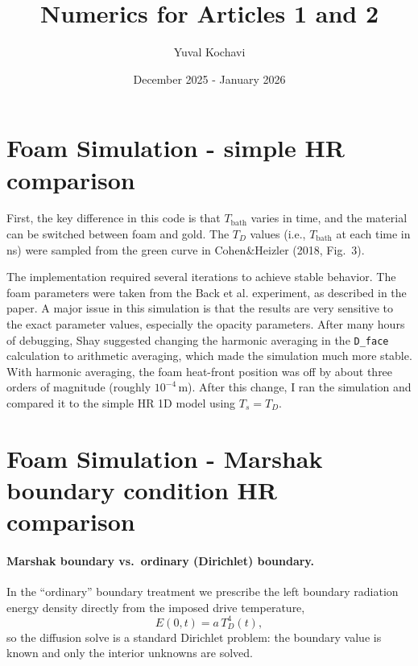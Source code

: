 \documentclass{article}
\title{Numerics for Articles 1 and 2}
\author{Yuval Kochavi}
\date{December 2025 - January 2026}
\begin{document}
\maketitle

\section{Foam Simulation - simple HR comparison}
First, the key difference in this code is that $T_{\text{bath}}$ varies in time, and the material can be switched between foam and gold. The $T_D$ values (i.e., $T_{\text{bath}}$ at each time in ns) were sampled from the green curve in Cohen\&Heizler (2018, Fig.~3).

The implementation required several iterations to achieve stable behavior. The foam parameters were taken from the Back et al. experiment, as described in the paper. A major issue in this simulation is that the results are very sensitive to the exact parameter values, especially the opacity parameters. After many hours of debugging, Shay suggested changing the harmonic averaging in the \texttt{D\_face} calculation to arithmetic averaging, which made the simulation much more stable. With harmonic averaging, the foam heat-front position was off by about three orders of magnitude (roughly $10^{-4}\,\mathrm{m}$). After this change, I ran the simulation and compared it to the simple HR 1D model using $T_s=T_D$.

\section{Foam Simulation - Marshak boundary condition HR comparison}
\label{sec:appendixA_energy_step}

\paragraph{Marshak boundary vs.\ ordinary (Dirichlet) boundary.}
In the ``ordinary'' boundary treatment we prescribe the left boundary radiation energy density directly from the imposed drive temperature,
\[
E(0,t)=a\,T_D^4(t),
\]
so the diffusion solve is a standard Dirichlet problem: the boundary value is known and only the interior unknowns are solved.
\end{document}
